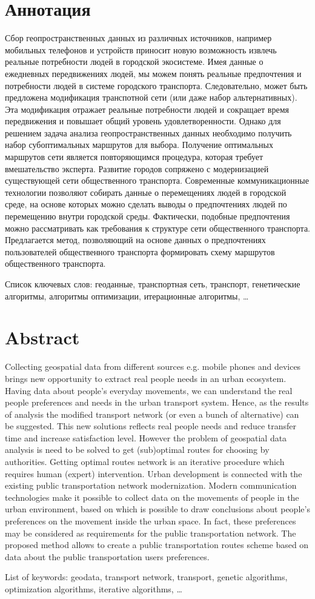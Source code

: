 \tocless\part{Аннотация}
Сбор геопространственных данных из различных источников, например мобильных телефонов и устройств приносит 
новую возможность извлечь реальные потребности людей в городской экосистеме. Имея данные о ежедневных 
передвижениях людей, мы можем понять реальные предпочтения и потребности людей в системе городского 
транспорта. Следовательно, может быть предложена модификация транспотной сети (или даже набор 
альтернативных). Эта модификация отражает реальные потребности людей и сокращает время передвижения и 
повышает общий уровень удовлетворенности. Однако для решением задача анализа геопространственных данных 
необходимо получить набор субоптимальных маршрутов для выбора. Получение оптимальных маршрутов сети 
является повторяющимся процедура, которая требует вмешательство эксперта.
Развитие городов сопряжено с модернизацией существующей сети общественного транспорта. Современные 
коммуникационные технологии позволяют собирать данные о перемещениях людей в городской среде, на основе 
которых можно сделать выводы о предпочтениях людей по перемещению внутри городской среды. Фактически, 
подобные предпочтения можно рассматривать как требования к структуре сети общественного транспорта. 
Предлагается метод, позволяющий на основе данных о предпочтениях пользователей общественного транспорта 
формировать схему маршрутов общественного транспорта.

Список ключевых слов: геоданные, транспортная сеть, транспорт, генетические алгоритмы, 
алгоритмы оптимизации, итерационные алгоритмы, \ldots

\tocless\part{Abstract}
Collecting geospatial data from different sources e.g. mobile phones and devices brings new opportunity to 
extract real people needs in an urban ecosystem. Having data about people's everyday movements, we can 
understand the real people preferences and needs in the urban transport system. Hence, as the results of 
analysis the modified transport network (or even a bunch of alternative) can be suggested. This new 
solutions reflects real people needs and reduce transfer time and increase satisfaction level. However the 
problem of geospatial data analysis is need to be solved to get (sub)optimal routes for choosing by 
authorities. Getting optimal routes network is an iterative procedure which requires human (expert) 
intervention.
Urban development is connected with the existing public transportation network modernization. Modern 
communication technologies make it possible to collect data on the movements of people in the urban 
environment, based on which is possible to draw conclusions about people's preferences on the movement 
inside the urban space. In fact, these preferences may be considered as requirements for the public 
transportation network. The proposed method allows to create a public transportation routes scheme based 
on data about the public transportation users preferences.

List of keywords: geodata, transport network, transport, genetic algorithms, optimization algorithms,
iterative algorithms, \ldots